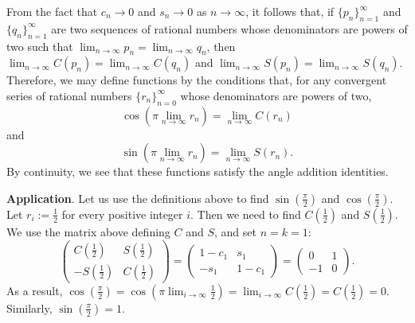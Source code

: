\documentclass[12pt]{article}
\begin{document}
From the fact that $c_n \to 0$ and $s_n \to 0$ as $n \to \infty$, it 
follows that, if $\{p_n\}_{n=1}^\infty$ and $\{q_n\}_{n=1}^\infty$ are 
two sequences of rational numbers whose denominators are powers of two
such that $\lim_{n \to \infty} p_n = \lim_{n \to \infty} q_n$, then
$\lim_{n \to \infty} C(p_n) = \lim_{n \to \infty} C(q_n)$ and
$\lim_{n \to \infty} S(p_n) = \lim_{n \to \infty} S(q_n)$.  Therefore,
we may define functions by the conditions that, for any convergent
series of rational numbers $\{r_n\}_{n=0}^\infty$ whose denominators
are powers of two,
 \[\cos \left( \pi  \lim_{n \to \infty} r_n \right) = 
\lim_{n \to \infty} C(r_n)\]
and
 \[\sin \left( \pi  \lim_{n \to \infty} r_n \right) = 
\lim_{n \to \infty} S(r_n).\] 
By continuity, we see that these functions satisfy the angle addition
identities.

\textbf{Application}.  Let us use the definitions above to find $\sin(\frac{\pi}{2})$ and $\cos(\frac{\pi}{2})$.  Let $r_i:=\frac{1}{2}$ for every positive integer $i$.  Then we need to find $C(\frac{1}{2})$ and $S(\frac{1}{2})$.  We use the matrix above defining $C$ and $S$, and set $n=k=1$:
 \[\left( \begin{matrix} C \left( {\frac{1}{2}} \right) & S \left( {\frac{1}{2}} \right) \\ - S \left( {\frac{1}{2}} \right) & C \left( {\frac{1}{2}} \right) \end{matrix} \right) = \left( \begin{matrix} 1 - c_1 
& s_1 \\ - s_1 & 1 - c_1 \end{matrix} \right) = \left( \begin{matrix} 0 & 1 \\ -1 & 0 \end{matrix} \right).\] 
As a result, $\cos(\frac{\pi}{2})= \cos(\pi \lim_{i \to \infty} \frac{1}{2}) = 
\lim_{i \to \infty} C(\frac{1}{2}) = C(\frac{1}{2}) = 0$.  Similarly, $\sin(\frac{\pi}{2})= 1$.
\end{document}
